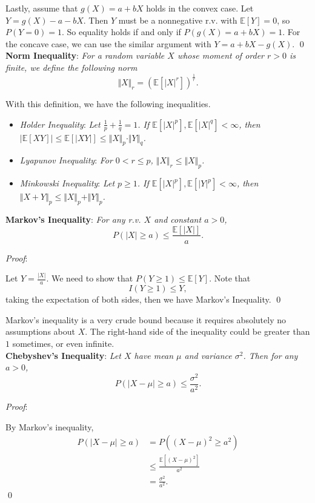 \documentclass{progartcn}
\begin{document}
			Lastly, assume that $g(X)=a+bX$ holds in the convex case. Let $Y=g(X)-a-bX$. Then $Y$ must be a nonnegative r.v. with $\mathbb{E}[Y]=0$, so $P(Y=0)=1$. So equality holds if and only if $P(g(X)=a+bX)=1$. For the concave case, we can use the similar argument with $Y=a+bX-g(X)$.
			\qed\\

		\textbf{Norm Inequality}: \textit{For a random variable $X$ whose moment of order $r>0$ is finite, we define the following norm}
			\[\Vert{X}\Vert_r=(\mathbb{E}[|X|^r])^\frac{1}{r}.\]

			With this definition, we have the following inequalities.
			\begin{itemize}[noitemsep,topsep=0pt]
				\item \textit{Holder Inequality}: \textit{Let $\frac{1}{p}+\frac{1}{q}=1$. If $\mathbb{E}[|X|^p], \mathbb{E}[|X|^q]<\infty$, then $|\mathbb{E}[XY]|\le \mathbb{E}[|XY|]\le \Vert X\Vert_p\cdot \Vert Y\Vert_q$.}
				\item \textit{Lyapunov Inequality}: \textit{For $0<r\le p$, $\Vert X\Vert_r\le\Vert X\Vert_p$.}
				\item \textit{Minkowski Inequality}: \textit{Let $p\ge 1$. If $\mathbb{E}[|X|^p], \mathbb{E}[|Y|^p]<\infty$, then $\Vert X+Y\Vert_p \le \Vert X\Vert_p+\Vert Y\Vert_p$.}\\
			\end{itemize}

		\textbf{Markov's Inequality}: \textit{For any r.v. $X$ and constant $a>0$,}
			\[P(|X|\ge a)\le \frac{\mathbb{E}[|X|]}{a}.\]

			\textit{Proof}:

			Let $Y=\frac{|X|}{a}$. We need to show that $P(Y\ge 1)\le \mathbb{E}[Y]$. Note that 
			\[I(Y\ge 1)\le Y,\]
			taking the expectation of both sides, then we have Markov's Inequality.
			\qed

			Markov's inequality is a very crude bound because it requires absolutely no assumptions about $X$. The right-hand side of the inequality could be greater than $1$ sometimes, or even infinite.\\

		\textbf{Chebyshev's Inequality}: \textit{Let $X$ have mean $\mu$ and variance $\sigma^2$. Then for any $a>0$,}
			\[P(|X-\mu|\ge a)\le \frac{\sigma^2}{a^2}.\]

			\textit{Proof}:

			By Markov's inequality,
			\[\begin{split}
			P(|X-\mu|\ge a)&=P((X-\mu)^2\ge a^2)\\
			&\le \frac{\mathbb{E}[(X-\mu)^2]}{a^2}\\
			&=\frac{\sigma^2}{a^2}.
			\end{split}
			\]
			\qed
\end{document}
